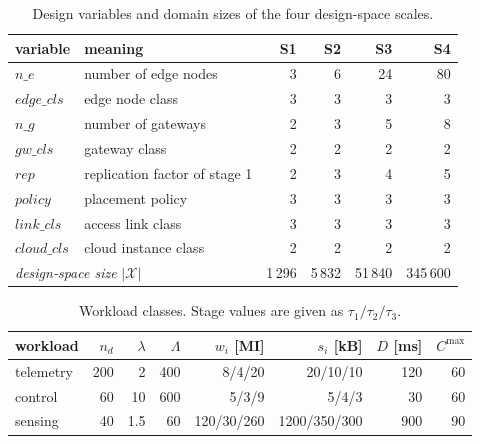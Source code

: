 \documentclass[pdflatex,sn-nature]{sn-jnl}
\theoremstyle{thmstyleone}
\theoremstyle{thmstyletwo}
\theoremstyle{thmstylethree}
\begin{document}
\begin{table}[!htbp]\centering
\caption{Design variables and domain sizes of the four design-space
scales.}\label{tabS8}
{\let\scriptsize\tiny\setlength{\tabcolsep}{2pt}\scriptsize
\begin{tabular}{llrrrr}
\toprule
variable & meaning & S1 & S2 & S3 & S4 \\
\midrule
$\mathit{n\_e}$ & number of edge nodes & 3 & 6 & 24 & 80 \\
$\mathit{edge\_cls}$ & edge node class & 3 & 3 & 3 & 3 \\
$\mathit{n\_g}$ & number of gateways & 2 & 3 & 5 & 8 \\
$\mathit{gw\_cls}$ & gateway class & 2 & 2 & 2 & 2 \\
$\mathit{rep}$ & replication factor of stage 1 & 2 & 3 & 4 & 5 \\
$\mathit{policy}$ & placement policy & 3 & 3 & 3 & 3 \\
$\mathit{link\_cls}$ & access link class & 3 & 3 & 3 & 3 \\
$\mathit{cloud\_cls}$ & cloud instance class & 2 & 2 & 2 & 2 \\
\midrule
\multicolumn{2}{l}{\emph{design-space size} $|\mathcal{X}|$} & 1\,296 & 5\,832 & 51\,840 & 345\,600 \\
\bottomrule
\end{tabular}}
\end{table}

\begin{table}[!htbp]\centering
\caption{Workload classes. Stage values are given as
$\tau_1/\tau_2/\tau_3$.}\label{tabS9}
{\let\scriptsize\tiny\setlength{\tabcolsep}{2pt}\scriptsize
\begin{tabular}{lrrrrrrr}
\toprule
workload & $n_d$ & $\lambda$ & $\Lambda$ & $w_i$ [MI] & $s_i$ [kB] & $D$ [ms] & $C^{\max}$ \\
\midrule
telemetry & 200 & 2 & 400 & 8/4/20 & 20/10/10 & 120 & 60 \\
control & 60 & 10 & 600 & 5/3/9 & 5/4/3 & 30 & 60 \\
sensing & 40 & 1.5 & 60 & 120/30/260 & 1200/350/300 & 900 & 90 \\
\bottomrule
\end{tabular}}
\end{table}
\end{document}
